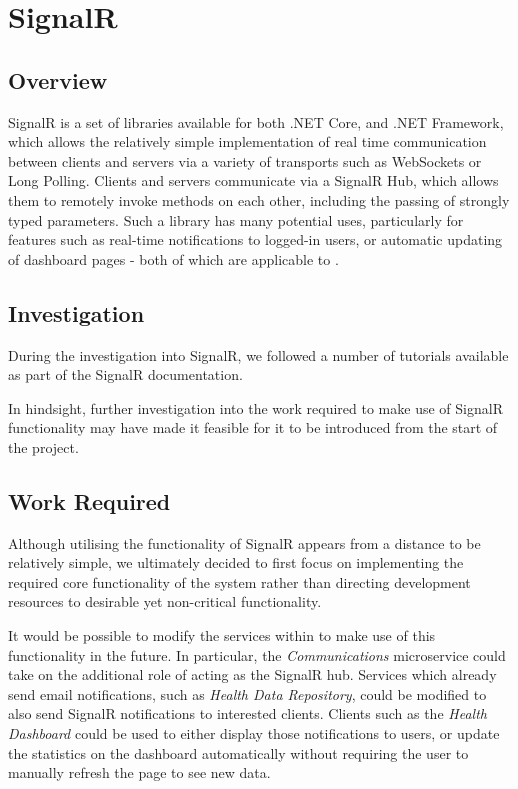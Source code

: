 \section{SignalR}

\subsection{Overview}

SignalR is a set of libraries available for both .NET Core, and .NET Framework, which allows the relatively simple implementation of real time communication between clients and servers via a variety of transports such as WebSockets or Long Polling\cite{SignalR}.  Clients and servers communicate via a SignalR Hub, which allows them to remotely invoke methods on each other, including the passing of strongly typed parameters.  Such a library has many potential uses, particularly for features such as real-time notifications to logged-in users, or automatic updating of dashboard pages - both of which are applicable to .

\subsection{Investigation}

During the investigation into SignalR, we followed a number of tutorials available as part of the SignalR documentation.

In hindsight, further investigation into the work required to make use of SignalR functionality may have made it feasible for it to be introduced from the start of the project.

\subsection{Work Required}

Although utilising the functionality of SignalR appears from a distance to be relatively simple, we ultimately decided to first focus on implementing the required core functionality of the system rather than directing development resources to desirable yet non-critical functionality.

It would be possible to modify the services within  to make use of this functionality in the future.  In particular, the \textit{Communications} microservice could take on the additional role of acting as the SignalR hub.  Services which already send email notifications, such as \textit{Health Data Repository}, could be modified to also send SignalR notifications to interested clients.  Clients such as the \textit{Health Dashboard} could be used to either display those notifications to users, or update the statistics on the dashboard automatically without requiring the user to manually refresh the page to see new data.

